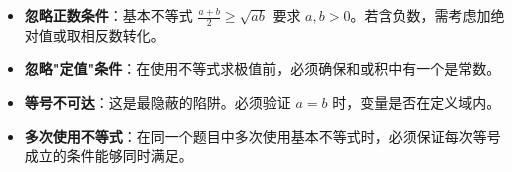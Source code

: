 \begin{trapbox}
\begin{itemize}
    \item \textbf{忽略正数条件}：基本不等式 $\frac{a+b}{2} \geqslant \sqrt{ab}$ 要求 $a, b > 0$。若含负数，需考虑加绝对值或取相反数转化。
    \item \textbf{忽略"定值"条件}：在使用不等式求极值前，必须确保和或积中有一个是常数。
    \item \textbf{等号不可达}：这是最隐蔽的陷阱。必须验证 $a=b$ 时，变量是否在定义域内。
    \item \textbf{多次使用不等式}：在同一个题目中多次使用基本不等式时，必须保证每次等号成立的条件能够同时满足。
\end{itemize}
\end{trapbox}
